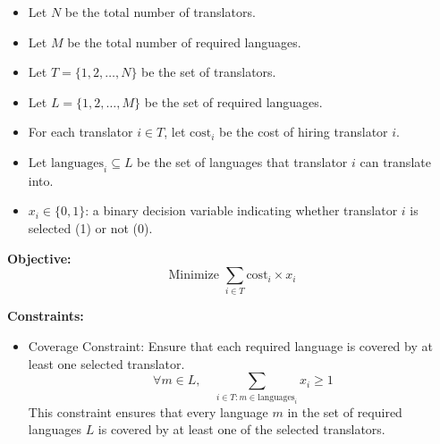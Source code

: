 \documentclass{article}
\begin{document}
\begin{itemize}
    \item Let $N$ be the total number of translators.
    \item Let $M$ be the total number of required languages.
    \item Let $T = \{1, 2, \ldots, N\}$ be the set of translators.
    \item Let $L = \{1, 2, \ldots, M\}$ be the set of required languages.
    \item For each translator $i \in T$, let $\text{cost}_i$ be the cost of hiring translator $i$.
    \item Let $\text{languages}_i \subseteq L$ be the set of languages that translator $i$ can translate into.
\end{itemize}

\begin{itemize}
    \item $x_i \in \{0, 1\}$: a binary decision variable indicating whether translator $i$ is selected (1) or not (0).
\end{itemize}

\textbf{Objective:}
\[
\text{Minimize } \sum_{i \in T} \text{cost}_i \times x_i
\]

\textbf{Constraints:}

\begin{itemize}
    \item Coverage Constraint: Ensure that each required language is covered by at least one selected translator.
    \[
    \forall m \in L, \quad \sum_{i \in T : m \in \text{languages}_i} x_i \geq 1
    \]
    This constraint ensures that every language $m$ in the set of required languages $L$ is covered by at least one of the selected translators.
\end{itemize}
\end{document}
